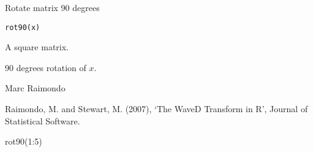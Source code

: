 \begin{Description}\relax
Rotate matrix 90 degrees
\end{Description}
\begin{Usage}
\begin{verbatim}
rot90(x)
\end{verbatim}
\end{Usage}
\begin{Arguments}
\begin{ldescription}
\item[\code{x}] A square matrix. 
\end{ldescription}
\end{Arguments}
\begin{Value}
90 degrees rotation of $x$.
\end{Value}
\begin{Author}\relax
Marc Raimondo
\end{Author}
\begin{References}\relax
Raimondo, M. and Stewart, M. (2007),
`The WaveD Transform in R', Journal of Statistical Software.
\end{References}
\begin{SeeAlso}\relax
{}
\end{SeeAlso}
\begin{Examples}
\begin{ExampleCode} rot90(1:5)\end{ExampleCode}
\end{Examples}

